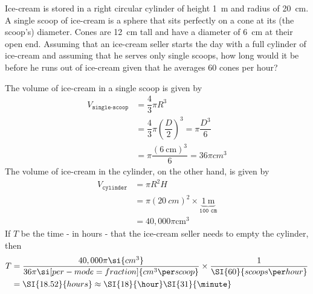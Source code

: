 

\question[3]  Ice-cream is stored in a right circular cylinder of height \SI{1}{\meter}
and radius of \SI{20}{\centi\meter}. A single scoop of ice-cream is a sphere that sits 
perfectly on a cone at its (the scoop's) diameter. Cones are \SI{12}{\centi\meter} tall and have a diameter of \SI{6}{\centi\meter} at their open end. Assuming that an ice-cream seller starts
the day with a full cylinder of ice-cream and assuming that he serves only 
single scoops, how long would it be before he runs out of ice-cream given that 
he averages 60 cones per hour?

\ifprintanswers
\fi 

\begin{solution}[\fullpage]
	The volume of ice-cream in a single scoop is given by
	\begin{align}
		V_{\texttt{single-scoop}} &= \dfrac{4}{3}\pi R^3 \\
		                 &= \dfrac{4}{3}\pi(\dfrac{D}{2})^3 = \pi\dfrac{D^3}{6} \\
		                 &= \pi\dfrac{(\SI{6}{\centi\meter})^3}{6} = 36\pi\si{cm^3}
	\end{align}
	The volume of ice-cream in the cylinder, on the other hand, is given by
	\begin{align}
		V_{\texttt{cylinder}} &= \pi R^2 H \\
		                      &= \pi(\SI{20}{cm})^2\times\underbrace{\SI{1}{\meter}}_{\texttt{100 cm}} \\
		                      &= 40,000\pi\si{\centi\meter}^3
	\end{align} 
	If $T$ be the time - in hours - that the ice-cream seller needs to empty the cylinder, then
	\begin{align}
		T &= \dfrac{40,000\pi\si{cm^3}}{36\pi\si[per-mode=fraction]{cm^3\per scoop}}
		     \times \dfrac{1}{\SI{60}{scoops\per hour}} \\
		  &= \SI{18.52}{hours}\approx \SI{18}{\hour}\SI{31}{\minute}
	\end{align}
\end{solution}
